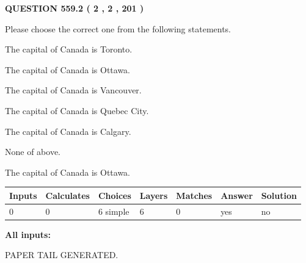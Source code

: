 \documentclass[12pt]{article}
\begin{document}
\vspace{0.2in}
  
{\textbf{\Large{QUESTION
559.2 
 ( 2 , 2 , 201 )
}}}
  
  
Please choose the correct one from the following statements.
 
 
The capital of Canada is Toronto.
 
 
The capital of Canada is Ottawa.
 
 
The capital of Canada is Vancouver.
 
 
The capital of Canada is Quebec City.
 
 
The capital of Canada is Calgary.
 
 
 None of above.
 
 
\noindent{}
 
 
The capital of Canada is Ottawa.
 
 
\noindent{}
 
 
   
   
   
   
\noindent\begin{tabular}{|l|l|l|l|l|l|l|}
 \hline
Inputs & Calculates & Choices & Layers & Matches & Answer & Solution \\ \hline
 0  & 
 0  & 
 6
  simple  
  & 
 6  & 
 0  & 
  yes & 
  no 
  \\ \hline
 \end{tabular}
   
   
   
   
\noindent{}
   
   
   
   
\noindent\vspace{0.1in}\hspace{-0.08in} {\textbf{\Large{All inputs: }}}
   
   
   
   
   
   
 \vspace{0.2in}
 
   
   
\vspace{2.0in} PAPER TAIL GENERATED.
   
\end{document}
